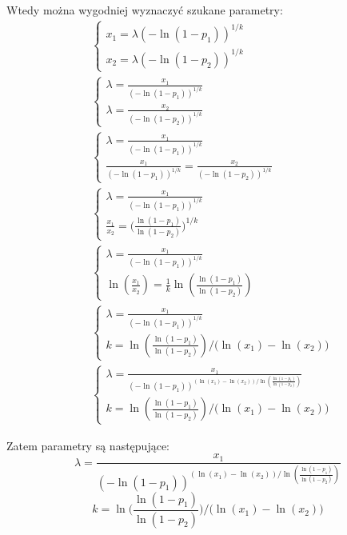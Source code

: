 \documentclass{article}
\begin{document}
Wtedy można wygodniej wyznaczyć szukane parametry: \\
\begin{align*}
&\left\{
\begin{array}{c} x_1 = \lambda (-\ln{(1-p_1)})^{1/k} \\ x_2 = \lambda (-\ln{(1-p_2)})^{1/k} \end{array} \right. \\
&\left\{
\begin{array}{c} \lambda = \frac{x_1}{(-\ln{(1-p_1)})^{1/k}} \\ \lambda = \frac{x_2}{(-\ln{(1-p_2)})^{1/k}} \end{array} \right. \\
&\left\{
\begin{array}{c} \lambda = \frac{x_1}{(-\ln{(1-p_1)})^{1/k}} \\ \frac{x_1}{(-\ln{(1-p_1)})^{1/k}} = \frac{x_2}{(-\ln{(1-p_2)})^{1/k}} \end{array} \right. \\
&\left\{
\begin{array}{c} \lambda = \frac{x_1}{(-\ln{(1-p_1)})^{1/k}} \\ \frac{x_1}{x_2} = \Big( \frac{\ln{(1-p_1)}}{\ln{(1-p_2)}} \Big)^{1/k} \end{array} \right. \\
&\left\{
\begin{array}{c} \lambda = \frac{x_1}{(-\ln{(1-p_1)})^{1/k}} \\ \ln{(\frac{x_1}{x_2})} = \frac{1}{k} \ln{(\frac{\ln{(1-p_1)}}{\ln{(1-p_2)}})} \end{array} \right. \\
&\left\{
\begin{array}{c} \lambda = \frac{x_1}{(-\ln{(1-p_1)})^{1/k}} \\ k = \ln{(\frac{\ln{(1-p_1)}}{\ln{(1-p_2)}})} / \big( \ln(x_1) - \ln(x_2) \big) \end{array} \right. \\
&\left\{
\begin{array}{c} \lambda = \frac{x_1}{(-\ln{(1-p_1)})^{ ( \ln(x_1) - \ln(x_2)) / \ln{(\frac{\ln{(1-p_1)}}{\ln{(1-p_2)}})}}} \\ k = \ln{(\frac{\ln{(1-p_1)}}{\ln{(1-p_2)}})} / \big( \ln(x_1) - \ln(x_2) \big) \end{array} \right.
\end{align*}

Zatem parametry są następujące:
\[ \lambda =  \frac{x_1}{(-\ln{(1-p_1)})^{ ( \ln(x_1) - \ln(x_2)) / \ln{(\frac{\ln{(1-p_1)}}{\ln{(1-p_2)}})}}} \]
\[ k =  \ln\Big(\frac{\ln{(1-p_1)}}{\ln{(1-p_2)}}\Big) / \big( \ln(x_1) - \ln(x_2) \big) \]
\end{document}
